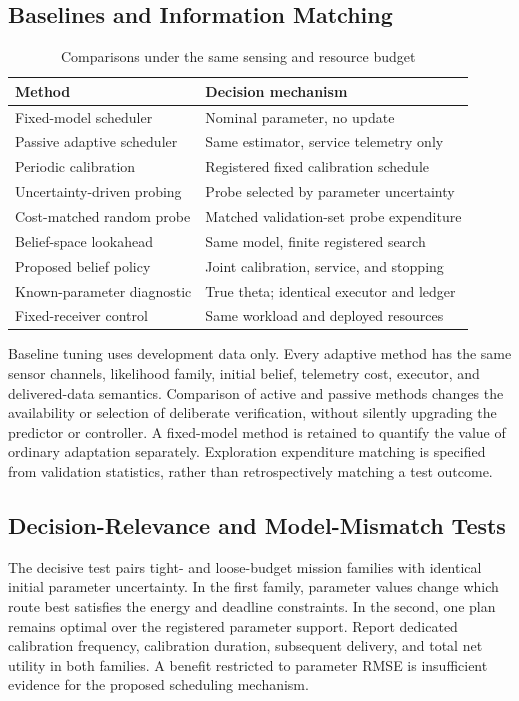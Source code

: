 \documentclass[10pt,twocolumn,letterpaper]{article}
\begin{document}
\subsection{Baselines and Information Matching}
\begin{table}[t]
\centering\footnotesize
\caption{Comparisons under the same sensing and resource budget}
\begin{tabularx}{\columnwidth}{XX}
\toprule
Method & Decision mechanism \\
\midrule
Fixed-model scheduler & Nominal parameter, no update \\
Passive adaptive scheduler & Same estimator, service telemetry only \\
Periodic calibration & Registered fixed calibration schedule \\
Uncertainty-driven probing & Probe selected by parameter uncertainty \\
Cost-matched random probe & Matched validation-set probe expenditure \\
Belief-space lookahead & Same model, finite registered search \\
Proposed belief policy & Joint calibration, service, and stopping \\
Known-parameter diagnostic & True theta; identical executor and ledger \\
Fixed-receiver control & Same workload and deployed resources \\
\bottomrule
\end{tabularx}
\end{table}
Baseline tuning uses development data only. Every adaptive method has the same sensor channels, likelihood family, initial belief, telemetry cost, executor, and delivered-data semantics. Comparison of active and passive methods changes the availability or selection of deliberate verification, without silently upgrading the predictor or controller. A fixed-model method is retained to quantify the value of ordinary adaptation separately. Exploration expenditure matching is specified from validation statistics, rather than retrospectively matching a test outcome.

\subsection{Decision-Relevance and Model-Mismatch Tests}
The decisive test pairs tight- and loose-budget mission families with identical initial parameter uncertainty. In the first family, parameter values change which route best satisfies the energy and deadline constraints. In the second, one plan remains optimal over the registered parameter support. Report dedicated calibration frequency, calibration duration, subsequent delivery, and total net utility in both families. A benefit restricted to parameter RMSE is insufficient evidence for the proposed scheduling mechanism.
\end{document}
